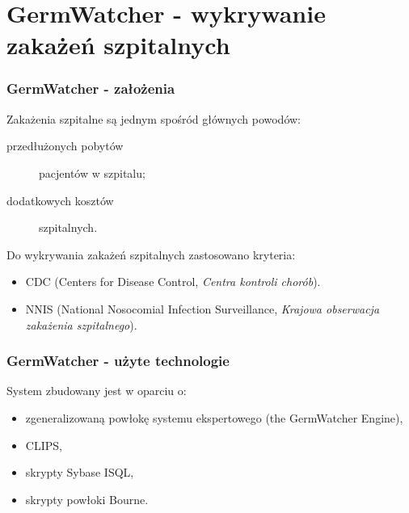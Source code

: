 \section{GermWatcher - wykrywanie zakażeń szpitalnych}


\begin{frame}
\frametitle{GermWatcher - założenia}

  Zakażenia szpitalne są jednym spośród głównych powodów:
  \begin{description} 
    \item[przedłużonych pobytów] pacjentów w szpitalu;
    \item[dodatkowych kosztów] szpitalnych.
  \end{description}

  Do wykrywania zakażeń szpitalnych zastosowano kryteria:
  \begin{itemize}
	  \item CDC (Centers for Disease Control, \textit{Centra kontroli chorób}).
	  \item NNIS (National Nosocomial Infection Surveillance, \textit{Krajowa obserwacja zakażenia szpitalnego}).
  \end{itemize} 

\end{frame}

\begin{frame}
\frametitle{GermWatcher - użyte technologie}

  System zbudowany jest w oparciu o:
  \begin{itemize}
	  \item zgeneralizowaną powłokę systemu ekspertowego (the GermWatcher Engine),
	  \item CLIPS,
	  \item skrypty Sybase ISQL,
	  \item skrypty powłoki Bourne.
  \end{itemize}

\end{frame}

